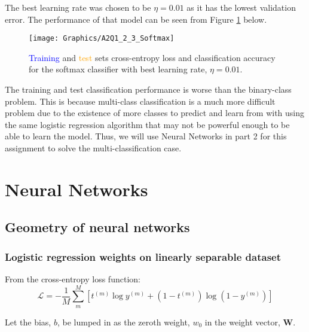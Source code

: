 \documentclass[a4paper,12pt]{article}
\begin{document}
The best learning rate was chosen to be $\eta = 0.01$ as it has the lowest validation error. The performance of that model can be seen from Figure \ref{figure:Softmax} below.

\begin{figure}[!htb]
\centering
\texttt{[image: Graphics/A2Q1\_2\_3\_Softmax]}
\caption{\label{figure:Softmax} \textcolor{blue}{Training} and \textcolor{orange}{test} sets cross-entropy loss and classification accuracy for the softmax classifier with best learning rate, $\eta = 0.01$.}
\end{figure}

The training and test classification performance is worse than the binary-class problem. This is because multi-class classification is a much more difficult problem due to the existence of more classes to predict and learn from with using the same logistic regression algorithm that may not be powerful enough to be able to learn the model. Thus, we will use Neural Networks in part 2 for this assignment to solve the multi-classification case. 

\clearpage
\section{Neural Networks}
\subsection{Geometry of neural networks}
\subsubsection{Logistic regression weights on linearly separable dataset}
\label{section:linearlySeparableProblem}

From the cross-entropy loss function:
\begin{equation}
\label{equation:crossEntropyLoss}
\mathcal{L} = - \frac{1}{M} \sum_m^M \left[ t^{(m)} \log y^{(m)} +
	\left(1 - t^{(m)} \right) \log \left( 1 - y^{(m)} \right) \right]
\end{equation}

Let the bias, $b$, be lumped in as the zeroth weight, $w_0$ in the weight vector, $\mathbf{W}$.
\end{document}
